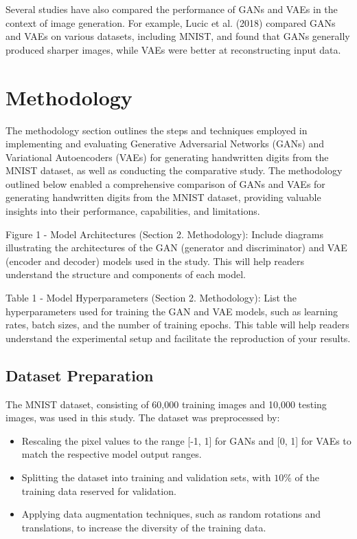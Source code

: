 \documentclass{article}
\begin{document}
Several studies have also compared the performance of GANs and VAEs in the context of image generation. For example, Lucic et al. (2018) compared GANs and VAEs on various datasets, including MNIST, and found that GANs generally produced sharper images, while VAEs were better at reconstructing input data.

\section{Methodology}
The methodology section outlines the steps and techniques employed in implementing and evaluating Generative Adversarial Networks (GANs) and Variational Autoencoders (VAEs) for generating handwritten digits from the MNIST dataset, as well as conducting the comparative study.
The methodology outlined below enabled a comprehensive comparison of GANs and VAEs for generating handwritten digits from the MNIST dataset, providing valuable insights into their performance, capabilities, and limitations.

Figure 1 - Model Architectures (Section 2. Methodology): Include diagrams illustrating the architectures of the GAN (generator and discriminator) and VAE (encoder and decoder) models used in the study. This will help readers understand the structure and components of each model.

Table 1 - Model Hyperparameters (Section 2. Methodology): List the hyperparameters used for training the GAN and VAE models, such as learning rates, batch sizes, and the number of training epochs. This table will help readers understand the experimental setup and facilitate the reproduction of your results.

\subsection{Dataset Preparation}
The MNIST dataset, consisting of 60,000 training images and 10,000 testing images, was used in this study. The dataset was preprocessed by:
\begin{itemize}
    \item Rescaling the pixel values to the range [-1, 1] for GANs and [0, 1] for VAEs to match the respective model output ranges.
    \item Splitting the dataset into training and validation sets, with $10\%$ of the training data reserved for validation.
    \item Applying data augmentation techniques, such as random rotations and translations, to increase the diversity of the training data.
\end{itemize}
\end{document}
